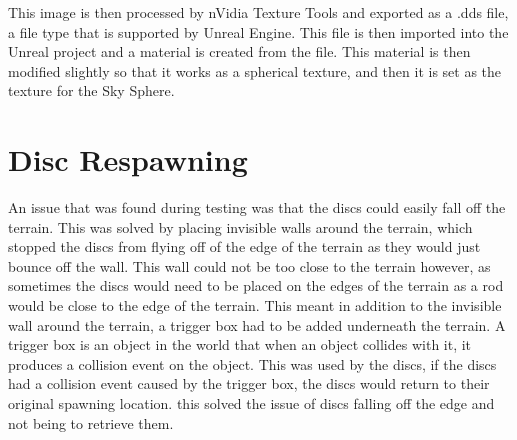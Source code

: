 This image is then processed by nVidia Texture Tools and exported as a .dds file, a file type that is supported by Unreal Engine. This file is then imported into the Unreal project and a material is created from the file. This material is then modified slightly so that it works as a spherical texture, and then it is set as the texture for the Sky Sphere.

\section{Disc Respawning}
An issue that was found during testing was that the discs could easily fall off the terrain. This was solved by placing invisible walls around the terrain, which stopped the discs from flying off of the edge of the terrain as they would just bounce off the wall. This wall could not be too close to the terrain however, as sometimes the discs would need to be placed on the edges of the terrain as a rod would be close to the edge of the terrain. This meant in addition to the invisible wall around the terrain, a trigger box had to be added underneath the terrain. A trigger box is an object in the world that when an object collides with it, it produces a collision event on the object. This was used by the discs, if the discs had a collision event caused by the trigger box, the discs would return to their original spawning location. this solved the issue of discs falling off the edge and not being to retrieve them.